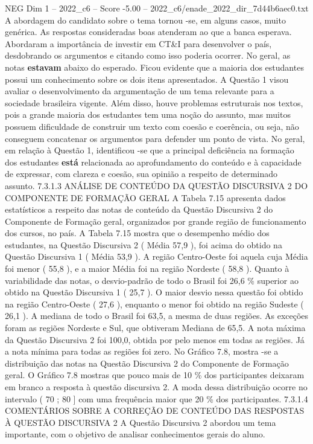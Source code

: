 \begin{textsample}{NEG Dim 1 – 2022\_c6 – Score -5.00 – 2022\_c6/enade\_2022\_dir\_7d44b6aec0.txt}
A abordagem do candidato sobre o tema tornou -se, em alguns casos, muito genérica.
As respostas consideradas boas atenderam ao que a banca esperava.
Abordaram a importância de investir em CT\&I para desenvolver o país, desdobrando os argumentos e citando como isso poderia ocorrer.
No geral, as notas \textbf{estavam} abaixo do esperado.
Ficou evidente que a maioria dos estudantes possui um conhecimento sobre os dois itens apresentados.
A Questão 1 visou avaliar o desenvolvimento da argumentação de um tema relevante para a sociedade brasileira vigente.
Além disso, houve problemas estruturais nos textos, pois a grande maioria dos estudantes tem uma noção do assunto, mas muitos possuem dificuldade de construir um texto com coesão e coerência, ou seja, não conseguem concatenar os argumentos para defender um ponto de vista.
No geral, em relação à Questão 1, identificou -se que a principal deficiência na formação dos estudantes \textbf{está} relacionada ao aprofundamento do conteúdo e à capacidade de expressar, com clareza e coesão, sua opinião a respeito de determinado assunto. 7.3.1.3 ANÁLISE DE CONTEÚDO DA QUESTÃO DISCURSIVA 2 DO COMPONENTE DE FORMAÇÃO GERAL A Tabela 7.15 apresenta dados estatísticos a respeito das notas de conteúdo da Questão Discursiva 2 do Componente de Formação geral, organizados por grande região de funcionamento dos cursos, no país.
A Tabela 7.15 mostra que o desempenho médio dos estudantes, na Questão Discursiva 2 ( Média 57,9 ), foi acima do obtido na Questão Discursiva 1 ( Média 53,9 ).
A região Centro-Oeste foi aquela cuja Média foi menor ( 55,8 ), e a maior Média foi na região Nordeste ( 58,8 ).
Quanto à variabilidade das notas, o desvio-padrão de todo o Brasil foi 26,6 \% superior ao obtido na Questão Discursiva 1 ( 25,7 ).
O maior desvio nessa questão foi obtido na região Centro-Oeste ( 27,6 ), enquanto o menor foi obtido na região Sudeste ( 26,1 ).
A mediana de todo o Brasil foi 63,5, a mesma de duas regiões.
As exceções foram as regiões Nordeste e Sul, que obtiveram Mediana de 65,5.
A nota máxima da Questão Discursiva 2 foi 100,0, obtida por pelo menos em todas as regiões.
Já a nota mínima para todas as regiões foi zero.
No Gráfico 7.8, mostra -se a distribuição das notas na Questão Discursiva 2 do Componente de Formação geral.
O Gráfico 7.8 mostras que pouco mais de 10 \% dos participantes deixaram em branco a resposta à questão discursiva 2.
A moda dessa distribuição ocorre no intervalo ( 70 ; 80 ] com uma frequência maior que 20 \% dos participantes. 7.3.1.4 COMENTÁRIOS SOBRE A CORREÇÃO DE CONTEÚDO DAS RESPOSTAS À QUESTÃO DISCURSIVA 2 A Questão Discursiva 2 abordou um tema importante, com o objetivo de analisar conhecimentos gerais do aluno.

\end{textsample}
